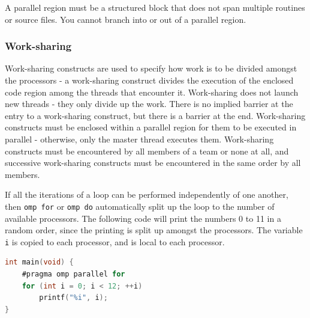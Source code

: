 \documentclass[10pt]{article}
\begin{document}
\begin{flushleft}
A parallel region must be a structured block that does not span multiple routines or source files. You cannot branch into or out of a parallel region. 

\subsubsection{Work-sharing}

Work-sharing constructs are used to specify how work is to be divided amongst the processors - a work-sharing construct divides the execution of the enclosed code region among the threads that encounter it. Work-sharing does not launch new threads - they only divide up the work. There is no implied barrier at the entry to a work-sharing construct, but there is a barrier at the end. Work-sharing constructs must be enclosed within a parallel region for them to be executed in parallel - otherwise, only the master thread executes them. Work-sharing constructs must be encountered by all members of a team or none at all, and successive work-sharing constructs must be encountered in the same order by all members. 

If all the iterations of a loop can be performed independently of one another, then {\tt omp for} or {\tt omp do} automatically split up the loop to the number of available processors. The following code will print the numbers 0 to 11 in a random order, since the printing is split up amongst the processors. The variable {\tt i} is copied to each processor, and is local to each processor.

\begin{lstlisting}[language=C, basicstyle=\ttfamily\small]
int main(void) {
	#pragma omp parallel for
	for (int i = 0; i < 12; ++i)
		printf("%i", i);
}
\end{lstlisting}


\end{flushleft}
\end{document}
